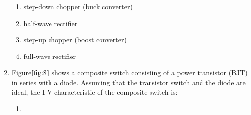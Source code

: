 \documentclass[journal]{IEEEtran}
\numberwithin{equation}{enumi}
\numberwithin{figure}{enumi}
\begin{document}
\begin{enumerate}
\begin{figure}[!ht]
			\centering
			
			\caption{}
			\label{fig:7}
		\end{figure}
    \begin{enumerate}
        \item step-down chopper (buck converter)
        \item half-wave rectifier
        \item step-up chopper (boost converter)
        \item full-wave rectifier
    \end{enumerate}

    \item Figure$\ref{fig:8}$ shows a composite switch consisting of a power transistor (BJT) in series with a diode. Assuming that the transistor switch and the diode are ideal, the I-V characteristic of the composite switch is:
    \begin{figure}[H]
    
			\centering
			
			\caption{}
			\label{fig:8}
		\end{figure}
    


\begin{enumerate}

    \item[]

    \begin{figure}[H]
        \centering


\end{figure}
\end{enumerate}
\end{enumerate}
\end{document}
